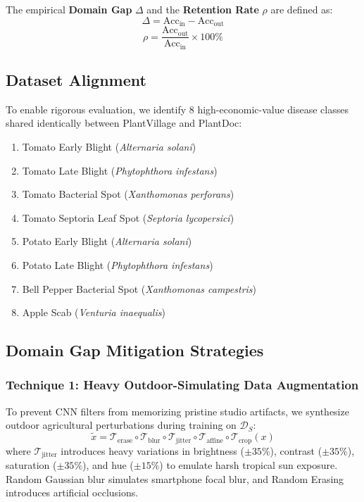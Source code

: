 \documentclass[twoside,a4paper,11pt]{article}
\begin{document}
The empirical \textbf{Domain Gap} $\Delta$ and the \textbf{Retention Rate} $\rho$ are defined as:
\begin{equation}
\Delta = \text{Acc}_{\text{in}} - \text{Acc}_{\text{out}}
\end{equation}
\begin{equation}
\rho = \frac{\text{Acc}_{\text{out}}}{\text{Acc}_{\text{in}}} \times 100\%
\end{equation}

\subsection{Dataset Alignment}
To enable rigorous evaluation, we identify 8 high-economic-value disease classes shared identically between PlantVillage and PlantDoc:
\begin{enumerate}
    \item Tomato Early Blight (\textit{Alternaria solani})
    \item Tomato Late Blight (\textit{Phytophthora infestans})
    \item Tomato Bacterial Spot (\textit{Xanthomonas perforans})
    \item Tomato Septoria Leaf Spot (\textit{Septoria lycopersici})
    \item Potato Early Blight (\textit{Alternaria solani})
    \item Potato Late Blight (\textit{Phytophthora infestans})
    \item Bell Pepper Bacterial Spot (\textit{Xanthomonas campestris})
    \item Apple Scab (\textit{Venturia inaequalis})
\end{enumerate}

\subsection{Domain Gap Mitigation Strategies}

\subsubsection{Technique 1: Heavy Outdoor-Simulating Data Augmentation}
To prevent CNN filters from memorizing pristine studio artifacts, we synthesize outdoor agricultural perturbations during training on $\mathcal{D}_S$:
\begin{equation}
\tilde{x} = \mathcal{T}_{\text{erase}} \circ \mathcal{T}_{\text{blur}} \circ \mathcal{T}_{\text{jitter}} \circ \mathcal{T}_{\text{affine}} \circ \mathcal{T}_{\text{crop}}(x)
\end{equation}
where $\mathcal{T}_{\text{jitter}}$ introduces heavy variations in brightness ($\pm 35\%$), contrast ($\pm 35\%$), saturation ($\pm 35\%$), and hue ($\pm 15\%$) to emulate harsh tropical sun exposure. Random Gaussian blur simulates smartphone focal blur, and Random Erasing introduces artificial occlusions.
\end{document}

